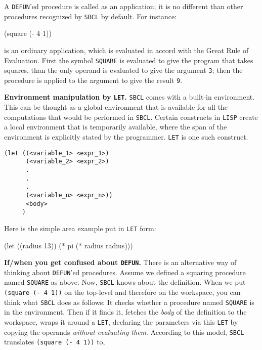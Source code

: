 \documentclass[a4paper,11pt]{article}
\begin{document}
\begin{uenum}
\begin{uenumi}
\item A \Verb+DEFUN+'ed procedure is called as an application; it is no different than other procedures recognized by \Verb+SBCL+ by default. For instance:

\begin{lispcode}
(square (- 4 1))
\end{lispcode}

is an ordinary application, which is evaluated in accord with the Great Rule of Evaluation. First the symbol \Verb+SQUARE+ is evaluated to give the program that takes squares, than the only operand is evaluated to give the argument \Verb+3+; then the procedure is applied to the argument to give the result \Verb+9+.
\end{uenumi}

\item {\bf Environment manipulation by \Verb+LET+.} \Verb+SBCL+ comes with a built-in environment. This can be thought as a global environment that is available for all the computations that would be performed in \Verb+SBCL+. Certain constructs in \Verb+LISP+ create a local environment that is temporarily available, where the span of the environment is explicitly stated by the programmer. \Verb+LET+ is one such construct.

\begin{ucodeframe}
\begin{Verbatim}
(let ((<variable_1> <expr_1>)
      (<variable_2> <expr_2>)
	  .  
	  .
	  .
      (<variable_n> <expr_n>))
      <body>
     )
\end{Verbatim}
\end{ucodeframe}

Here is the simple area example put in \Verb+LET+ form:

\begin{lispcode}
(let ((radius 13)) (* pi (* radius radius)))
\end{lispcode}
\item {\bf If/when you get confused about \Verb+DEFUN+.} There is an alternative way of thinking about \Verb+DEFUN+'ed procedures. Assume we defined a squaring procedure named \Verb+SQUARE+ as above. Now, \Verb+SBCL+ knows about the definition. When we put \Verb+(square (- 4 1))+ on the top-level and therefore on the workspace, you can think what \Verb+SBCL+ does as follows: It checks whether a procedure named \Verb+SQUARE+ is in the environment. Then if it finds it, fetches the \emph{body} of the definition to the workspace, wraps it around a \Verb+LET+, declaring the parameters via this \Verb+LET+ by copying the operands \emph{without evaluating them}. According to this model, \Verb+SBCL+ translates \Verb+(square (- 4 1))+ to,


\end{uenum}
\end{document}
